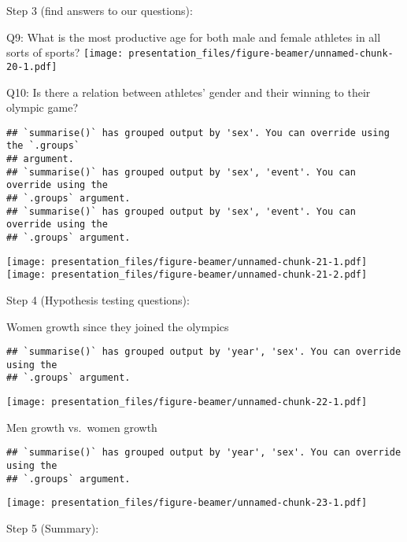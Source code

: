 \documentclass[
  ignorenonframetext,
]{beamer}
\begin{document}
\begin{frame}[fragile]{Step 3 (find answers to our questions):}
\begin{block}{Q9: What is the most productive age for both male and
female athletes in all sorts of sports?}
\texttt{[image: presentation\_files/figure-beamer/unnamed-chunk-20-1.pdf]}
\end{block}

\begin{block}{Q10: Is there a relation between athletes' gender and
their winning to their olympic game?}
\protect\hypertarget{q10-is-there-a-relation-between-athletes-gender-and-their-winning-to-their-olympic-game}{}
\begin{verbatim}
## `summarise()` has grouped output by 'sex'. You can override using the `.groups`
## argument.
## `summarise()` has grouped output by 'sex', 'event'. You can override using the
## `.groups` argument.
## `summarise()` has grouped output by 'sex', 'event'. You can override using the
## `.groups` argument.
\end{verbatim}

\texttt{[image: presentation\_files/figure-beamer/unnamed-chunk-21-1.pdf]}
\texttt{[image: presentation\_files/figure-beamer/unnamed-chunk-21-2.pdf]}
\end{block}
\end{frame}

\begin{frame}[fragile]{Step 4 (Hypothesis testing questions):}
\protect\hypertarget{step-4-hypothesis-testing-questions}{}
\begin{block}{Women growth since they joined the olympics}
\protect\hypertarget{women-growth-since-they-joined-the-olympics}{}
\begin{verbatim}
## `summarise()` has grouped output by 'year', 'sex'. You can override using the
## `.groups` argument.
\end{verbatim}

\texttt{[image: presentation\_files/figure-beamer/unnamed-chunk-22-1.pdf]}
\end{block}

\begin{block}{Men growth vs.~women growth}
\protect\hypertarget{men-growth-vs.-women-growth}{}
\begin{verbatim}
## `summarise()` has grouped output by 'year', 'sex'. You can override using the
## `.groups` argument.
\end{verbatim}

\texttt{[image: presentation\_files/figure-beamer/unnamed-chunk-23-1.pdf]}
\end{block}
\end{frame}

\begin{frame}{Step 5 (Summary):}
\protect\hypertarget{step-5-summary}{}
\end{frame}
\end{document}
